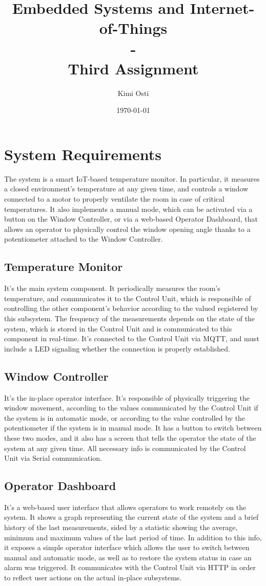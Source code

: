 \documentclass[a4paper,12pt]{report}
\title{Embedded Systems and Internet-of-Things \\ - \\ Third Assignment}
\author{Kimi Osti}
\date{\today}
\begin{document}
	
	\maketitle
	\tableofcontents
	
	\chapter{System Requirements}
	The system is a smart IoT-based temperature monitor. In particular, it measures a closed environment's temperature at any given time, and controls a window connected to a motor to properly ventilate the room in case of critical temperatures. It also implements a manual mode, which can be activated via a button on the Window Controller, or via a web-based Operator Dashboard, that allows an operator to physically control the window opening angle thanks to a potentiometer attached to the Window Controller.
	\section{Temperature Monitor}
	It's the main system component. It periodically measures the room's temperature, and communicates it to the Control Unit, which is responsible of controlling the other component's behavior according to the valued registered by this subsystem. The frequency of the measurements depends on the state of the system, which is stored in the Control Unit and is communicated to this component in real-time. It's connected to the Control Unit via MQTT, and must include a LED signaling whether the connection is properly established.
	\section{Window Controller}
	It's the in-place operator interface. It's responsible of physically triggering the window movement, according to the values communicated by the Control Unit if the system is in automatic mode, or according to the value controlled by the potentiometer if the system is in manual mode. It has a button to switch between these two modes, and it also has a screen that tells the operator the state of the system at any given time. All necessary info is communicated by the Control Unit via Serial communication.
	\section{Operator Dashboard}
	It's a web-based user interface that allows operators to work remotely on the system. It shows a graph representing the current state of the system and a brief history of the last measurements, sided by a statistic showing the average, minimum and maximum values of the last period of time. In addition to this info, it exposes a simple operator interface which allows the user to switch between manual and automatic mode, as well as to restore the system status in case an alarm was triggered. It communicates with the Control Unit via HTTP in order to reflect user actions on the actual in-place subsystems.
\end{document}

